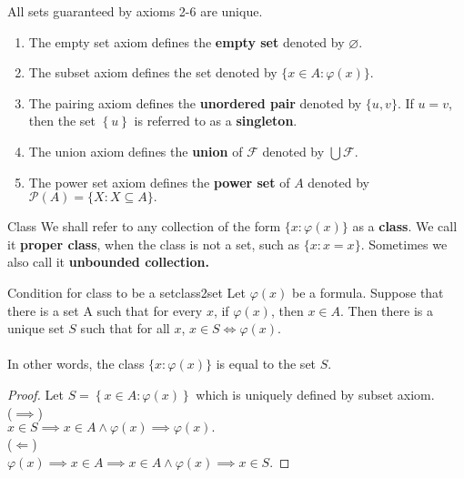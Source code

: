 \begin{remarks}
    All sets guaranteed by axioms 2-6 are unique.
    \begin{enumerate}
        \item The empty set axiom defines the \textbf{empty set} denoted by $\varnothing$.
        \item The subset axiom defines the set denoted by $\{x \in A:\varphi(x)\}$.
        \item The pairing axiom defines the \textbf{unordered pair} denoted by $\{u, v\}$.
        If $u = v$, then the set $\left\{u\right\}$ is referred to as a \textbf{singleton}.
        \item The union axiom defines the \textbf{union} of $\mathcal{F}$ denoted by $\bigcup \mathcal{F}$.
        \item The power set axiom defines the \textbf{power set} of $A$ denoted by $\mathcal{P}(A) = \{X:X \subseteq A\}.$
    \end{enumerate}
\end{remarks}

\begin{definition}{Class}{}
    We shall refer to any collection of the form $\{x:\varphi(x)\}$ as a \textbf{class}. We call it \textbf{proper class}, 
    when the class is not a set, such as $\{x:x=x\}$. Sometimes we also call it \textbf{unbounded collection.}
\end{definition}

\begin{theorem}{Condition for class to be a set}{class2set}
    Let $\varphi(x)$ be a formula. Suppose that there is a set A such that for every $x$, if $\varphi(x)$, then $x \in A$. Then there is a unique set $S$ such that for all $x$, $x \in S \iff \varphi(x)$.\\
    \\
    In other words, the class $\{x:\varphi(x)\}$ is equal to the set $S$.
\end{theorem}

\begin{proof}
    Let $S = \left\{x \in A \colon \varphi(x) \right\}$ which is uniquely defined by subset axiom.\\
    ($ \implies $)\\
    $x \in S \implies x \in A \land \varphi(x) \implies \varphi(x).$\\
    ($ \Leftarrow $)\\
    $\varphi(x) \implies x \in A \implies x \in A \land \varphi(x) \implies x \in S.$
\end{proof}

